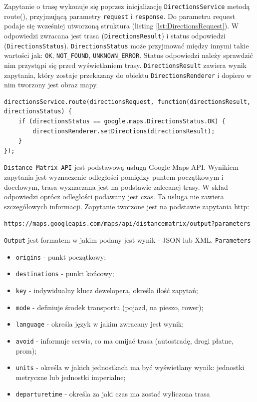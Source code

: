 \documentclass[eng,printmode,oneside]{mgr}
\begin{document}
Zapytanie o trasę wykonuje się poprzez inicjalizację \texttt{DirectionsService}
metodą route(), przyjmującą parametry \texttt{request} i \texttt{response}. Do
parametru request podaje się wcześniej utworzoną struktura (listing
\ref{lst:DirectionsRequest}). W odpowiedzi zwracana jest
trasa (\texttt{DirectionsResult}) i status odpowiedzi
(\texttt{DirectionsStatus}). \texttt{DirectionsStatus} może przyjmować między
innymi takie wartości jak: \texttt{OK}, \texttt{NOT\_FOUND},
\texttt{UNKNOWN\_ERROR}. Status odpowiedzi należy sprawdzić nim przystąpi się
przed wyświetlaniem trasy. \texttt{DirectionsResult} zawiera wynik zapytania,
który zostaje przekazany do obiektu \texttt{DirectionsRenderer} i dopiero w nim
tworzony jest obraz mapy.

\begin{lstlisting}[caption=Przykład wywołania
funkcji \texttt{route()},label=lst:DirectionsService]
directionsService.route(directionsRequest, function(directionsResult, directionsStatus) { 
	if (directionsStatus == google.maps.DirectionsStatus.OK) {
		directionsRenderer.setDirections(directionsResult);
	}
});
\end{lstlisting}

\texttt{Distance Matrix API} jest podstawową usługą Google Maps API. Wynikiem
zapytania jest wyznaczenie odległości pomiędzy puntem początkowym i docelowym,
trasa wyznaczana jest na podstawie zalecanej trasy. W skład odpowiedzi oprócz
odległości podawany jest czas. Ta usługa nie zawiera szczegółowych informacji.
Zapytanie tworzone jest na podstawie zapytania http:

\texttt{https://maps.googleapis.com/maps/api/distancematrix/output?parameters}

\texttt{Output} jest formatem w jakim podany jest wynik - JSON lub XML.
\texttt{Parameters} 
\begin{itemize}
  \item \texttt{origins} - punkt początkowy;
  \item \texttt{destinations} - punkt końcowy;
  \item \texttt{key} - indywidualny klucz dewelopera, określa ilość zapytań;
  \item \texttt{mode} - definiuje środek transportu (pojazd, na pieszo, rower);
  \item \texttt{language} - określa język w jakim zwracany jest wynik;
  \item \texttt{avoid} - informuje serwis, co ma omijać trasa (autostradę,
  drogi płatne, prom);
  \item \texttt{units} - określa w jakich jednostkach ma być wyświetlany wynik:
  jednostki metryczne lub jednostki imperialne;
  \item \texttt{departure\-time} - określa za jaki czas ma zostać
  wyliczona trasa
\end{itemize}
\end{document}
